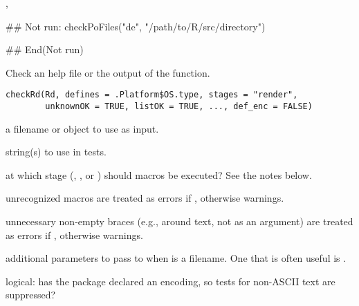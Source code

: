 %
\begin{SeeAlso}\relax
{}, 
\end{SeeAlso}
%
\begin{Examples}
\begin{ExampleCode}
## Not run: 
checkPoFiles("de", "/path/to/R/src/directory")

## End(Not run)
\end{ExampleCode}
\end{Examples}
%
\begin{Description}\relax
Check an help file or the output of the  function.
\end{Description}
%
\begin{Usage}
\begin{verbatim}
checkRd(Rd, defines = .Platform$OS.type, stages = "render",
        unknownOK = TRUE, listOK = TRUE, ..., def_enc = FALSE)
\end{verbatim}
\end{Usage}
%
\begin{Arguments}
\begin{ldescription}
\item[\code{Rd}]  a filename or  object to use as input. 
\item[\code{defines}]  string(s) to use in  tests. 
\item[\code{stages}]  at which stage (, , or
) should  macros be executed? See the
notes below.
\item[\code{unknownOK}]  unrecognized macros are treated as errors if
, otherwise warnings. 
\item[\code{listOK}]  unnecessary non-empty braces (e.g., around text, not as
an argument) are treated as errors if , otherwise
warnings.
\item[\code{...}]  additional parameters to pass to  when
 is a filename.  One that is often useful is .
\item[\code{def\_enc}] logical: has the package declared an encoding, so tests
for non-ASCII text are suppressed?
\end{ldescription}
\end{Arguments}
%

